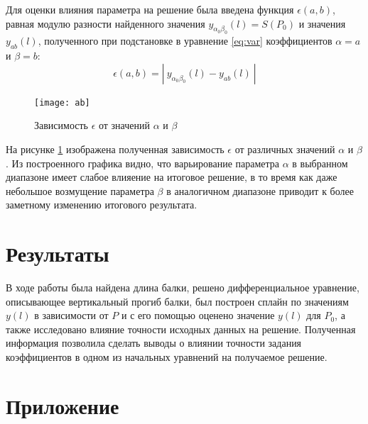 Для оценки влияния параметра на решение была введена функция $\epsilon(a, b)$, равная модулю разности найденного значения $y_{\alpha_0\beta_0}(l) = S(P_0)$ и значения $y_{ab}(l)$, полученного при подстановке в уравнение \ref{eq:var} коэффициентов $\alpha = a$ и $\beta = b$:
\begin{equation}
	\epsilon(a, b) = |\ y_{\alpha_0\beta_0}(l) - y_{ab}(l)\ |
\end{equation}

\begin{figure}[H]
\begin{center}
	\vspace{-0.5cm}
	\texttt{[image: ab]}
	\caption{Зависимость $\epsilon$ от значений $\alpha$ и $\beta$}
	\label{plt:ab}
	\vspace{-0.5cm}
\end{center}
\end{figure}

На рисунке \ref{plt:ab} изображена полученная зависимость $\epsilon$ от различных значений $\alpha$ и $\beta$. Из построенного графика видно, что варьирование параметра  $\alpha$  в выбранном диапазоне имеет слабое влияение на итоговое решение, в то время как даже небольшое возмущение параметра  $\beta$  в аналогичном диапазоне приводит к более заметному изменению итогового результата.

\section{Результаты}

В ходе работы была найдена длина балки, решено дифференциальное уравнение, описывающее вертикальный прогиб балки, был построен сплайн по значениям $y(l)$ в зависимости от $P$ и с его помощью оценено значение $y(l)$ для $P_0$, а также исследовано влияние точности исходных данных на решение. Полученная информация позволила сделать выводы о влиянии точности задания коэффициентов в одном из начальных уравнений на получаемое решение.

\section*{Приложение}



